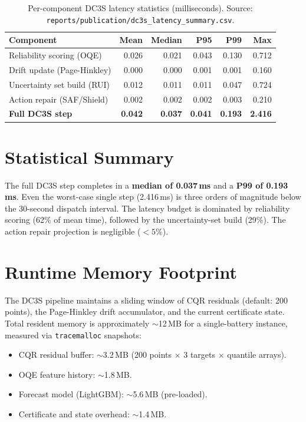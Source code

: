 \begin{table}[ht]
\centering
\caption{Per-component DC3S latency statistics (milliseconds).
  Source: \texttt{reports/publication/dc3s\_latency\_summary.csv}.}
\label{tab:latency}
\begin{tabular}{lrrrrr}
\toprule
\textbf{Component} & \textbf{Mean} & \textbf{Median} &
  \textbf{P95} & \textbf{P99} & \textbf{Max} \\
\midrule
Reliability scoring (OQE)     & 0.026 & 0.021 & 0.043 & 0.130 & 0.712 \\
Drift update (Page-Hinkley)   & 0.000 & 0.000 & 0.001 & 0.001 & 0.160 \\
Uncertainty set build (RUI)   & 0.012 & 0.011 & 0.011 & 0.047 & 0.724 \\
Action repair (SAF/Shield)    & 0.002 & 0.002 & 0.002 & 0.003 & 0.210 \\
\midrule
\textbf{Full DC3S step}       & \textbf{0.042} & \textbf{0.037} &
  \textbf{0.041} & \textbf{0.193} & \textbf{2.416} \\
\bottomrule
\end{tabular}
\end{table}

\section{Statistical Summary}

The full DC3S step completes in a \textbf{median of 0.037\,ms} and
a \textbf{P99 of 0.193\,ms}.  Even the worst-case single step
(2.416\,ms) is three orders of magnitude below the 30-second dispatch
interval.  The latency budget is dominated by reliability scoring
(62\% of mean time), followed by the uncertainty-set build (29\%).
The action repair projection is negligible ($<5\%$).

\section{Runtime Memory Footprint}

The DC3S pipeline maintains a sliding window of CQR residuals
(default: 200 points), the Page-Hinkley drift accumulator, and the
current certificate state.  Total resident memory is approximately
$\sim$12\,MB for a single-battery instance, measured via
\texttt{tracemalloc} snapshots:

\begin{itemize}
  \item CQR residual buffer: $\sim$3.2\,MB
    (200 points $\times$ 3 targets $\times$ quantile arrays).
  \item OQE feature history: $\sim$1.8\,MB.
  \item Forecast model (LightGBM): $\sim$5.6\,MB (pre-loaded).
  \item Certificate and state overhead: $\sim$1.4\,MB.
\end{itemize}

